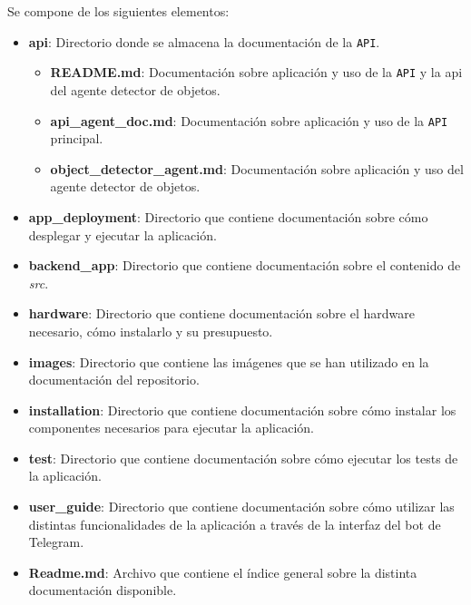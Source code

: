 Se compone de los siguientes elementos:

\vspace{-0.5cm}

\begin{itemize}
\item \textbf{api}: Directorio donde se almacena la documentación de la \texttt{API}.

	\begin{itemize}
	\item \textbf{README.md}: Documentación sobre aplicación y uso de la \texttt{API} y la api del agente detector de objetos.
	\item \textbf{api\_agent\_doc.md}: Documentación sobre aplicación y uso de la \texttt{API} principal.
	\item \textbf{object\_detector\_agent.md}: Documentación sobre aplicación y uso del agente detector de objetos.
	\end{itemize}

\item \textbf{app\_deployment}: Directorio que contiene documentación sobre cómo desplegar y ejecutar la aplicación.

\item \textbf{backend\_app}: Directorio que contiene documentación sobre el contenido de  \textit{src}.

\item \textbf{hardware}: Directorio que contiene documentación sobre el hardware necesario, cómo instalarlo y su presupuesto.

\item \textbf{images}: Directorio que contiene las imágenes que se han utilizado en la documentación del repositorio.

\item \textbf{installation}: Directorio que contiene documentación sobre cómo instalar los componentes necesarios para ejecutar la aplicación.

\item \textbf{test}: Directorio que contiene documentación sobre cómo ejecutar los tests de la aplicación.

\item \textbf{user\_guide}: Directorio que contiene documentación sobre cómo utilizar las distintas funcionalidades de la aplicación a través de la interfaz del bot de Telegram.

\item \textbf{Readme.md}: Archivo que contiene el índice general sobre la distinta documentación disponible.

\end{itemize}


